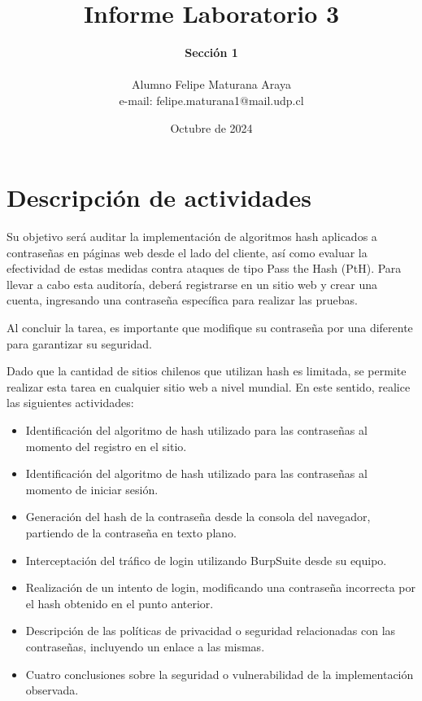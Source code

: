 \documentclass[letter,12pt]{article}
\begin{document}
%
   \title{\Huge{Informe Laboratorio 3}}

   \author{\textbf{Sección 1} \\  \\Alumno Felipe Maturana Araya \\ e-mail: felipe.maturana1@mail.udp.cl}
          
   \date{Octubre de 2024}

   \maketitle
   
   \tableofcontents
 
  \newpage
  

\section{Descripción de actividades}
Su objetivo será auditar la implementación de algoritmos hash aplicados a contraseñas en páginas web desde el lado del cliente, así como evaluar la efectividad de estas medidas contra ataques de tipo Pass the Hash (PtH). Para llevar a cabo esta auditoría, deberá registrarse en un sitio web y crear una cuenta, ingresando una contraseña específica para realizar las pruebas.\par

Al concluir la tarea, es importante que modifique su contraseña por una diferente para garantizar su seguridad.\par

Dado que la cantidad de sitios chilenos que utilizan hash es limitada, se permite realizar esta tarea en cualquier sitio web a nivel mundial. En este sentido, realice las siguientes actividades:


\begin{itemize}
    \item Identificación del algoritmo de hash utilizado para las contraseñas al momento del registro en el sitio.
    
    \item Identificación del algoritmo de hash utilizado para las contraseñas al momento de iniciar sesión.

    \item Generación del hash de la contraseña desde la consola del navegador, partiendo de la contraseña en texto plano.

    \item Interceptación del tráfico de login utilizando BurpSuite desde su equipo.

    \item Realización de un intento de login, modificando una contraseña incorrecta por el hash obtenido en el punto anterior.

    \item Descripción de las políticas de privacidad o seguridad relacionadas con las contraseñas, incluyendo un enlace a las mismas.

    \item Cuatro conclusiones sobre la seguridad o vulnerabilidad de la implementación observada.
\end{itemize}
\end{document}
